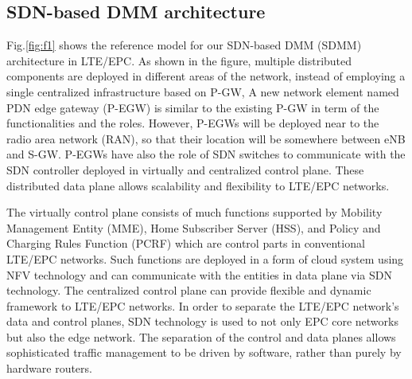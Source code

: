 \documentclass[runningheads,a4paper]{llncs}
\begin{document}
\subsection{SDN-based DMM architecture}
Fig.\ref{fig:f1} shows the reference model for our SDN-based DMM (SDMM) architecture in LTE/EPC. As shown in the figure, multiple distributed components are deployed in different areas of the network, instead of employing a single centralized infrastructure based on P-GW,  A new network element named PDN edge gateway (P-EGW) is similar to the existing P-GW in term of the functionalities and the roles. However, P-EGWs will be deployed near to the radio area network (RAN), so that their location will be somewhere between eNB and S-GW. P-EGWs have also the role of SDN switches to communicate with the SDN controller deployed in virtually and centralized control plane. These distributed data plane allows scalability and flexibility to LTE/EPC networks.

The virtually control plane consists of much functions supported by Mobility Management Entity (MME), Home Subscriber Server (HSS), and Policy and Charging Rules Function (PCRF) which are control parts in conventional LTE/EPC networks. Such functions are deployed in a form of cloud system using NFV technology and can communicate with the entities in data plane via SDN technology. The centralized control plane can provide flexible and dynamic framework to LTE/EPC networks. In order to separate the LTE/EPC network's data and control planes, SDN technology is used to not only EPC core networks but also the edge network. The separation of the control and data planes allows sophisticated traffic management to be driven by software, rather than purely by hardware routers.
\end{document}
